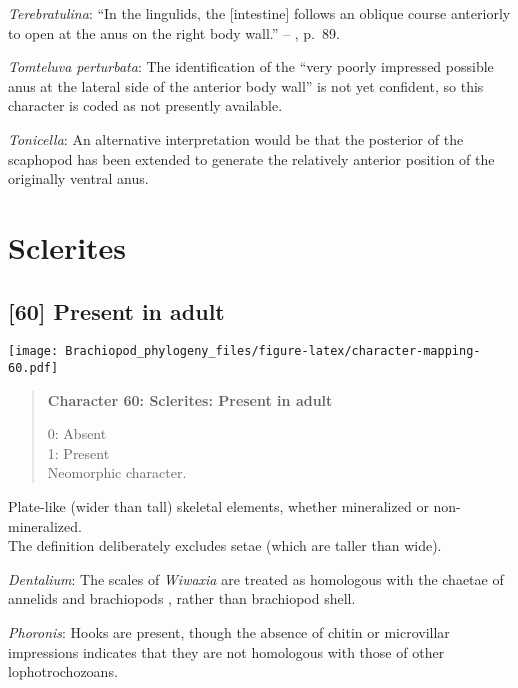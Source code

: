 \documentclass[openany]{book}
\theoremstyle{definition}
\theoremstyle{definition}
\theoremstyle{definition}
\theoremstyle{remark}
\begin{document}
\hypertarget{Terebratulina-coding-59}{}
\emph{Terebratulina}: ``In the lingulids, the {[}intestine{]} follows an
oblique course anteriorly to open at the anus on the right body wall.''
-- \citet{Williams1997Introduction}, p.~89.

\hypertarget{Tomteluva_perturbata-coding-59}{}
\emph{Tomteluva perturbata}: The identification of the ``very poorly
impressed possible anus at the lateral side of the anterior body wall''
is not yet confident, so this character is coded as not presently
available.

\hypertarget{Tonicella-coding-59}{}
\emph{Tonicella}: An alternative interpretation would be that the
posterior of the scaphopod has been extended to generate the relatively
anterior position of the originally ventral anus.

\section{Sclerites}\label{sclerites}

\subsection*{{[}60{]} Present in adult}\label{present-in-adult}

\texttt{[image: Brachiopod\_phylogeny\_files/figure-latex/character-mapping-60.pdf]}

\begin{quote}
\textbf{Character 60: Sclerites: Present in adult}

0: Absent\\
1: Present\\
Neomorphic character.
\end{quote}

Plate-like (wider than tall) skeletal elements, whether mineralized or
non-mineralized.\\
The definition deliberately excludes setae (which are taller than wide).

\hypertarget{Dentalium-coding-60}{}
\emph{Dentalium}: The scales of \emph{Wiwaxia} are treated as homologous
with the chaetae of annelids and brachiopods
\citep{Butterfield1990, Smith2014, Zhang2015}, rather than brachiopod
shell.

\hypertarget{Phoronis-coding-60}{}
\emph{Phoronis}: Hooks are present, though the absence of chitin or
microvillar impressions indicates that they are not homologous with
those of other lophotrochozoans.
\end{document}
